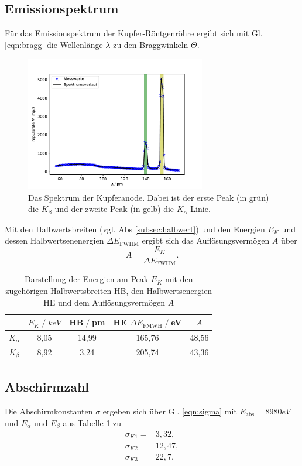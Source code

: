 \subsection{Emissionspektrum}
Für das Emissionspektrum der Kupfer-Röntgenröhre ergibt sich mit Gl. \ref{eqn:bragg} die 
Wellenlänge $\lambda$ zu den Braggwinkeln $\Theta$.
\begin{figure}[H]
    \centering
    \includegraphics[width=0.7\textwidth]{plots/spektrum.pdf}
    \caption{Das Spektrum der Kupferanode. Dabei ist der erste Peak (in grün)
    die $K_{\beta}$ und der zweite Peak (in gelb) die $K_{\alpha}$ 
    Linie.}
    \label{fig:peaks}
\end{figure}
Mit den Halbwertsbreiten (vgl. Abs \ref{subsec:halbwert}) und den Energien $E_K$ und dessen Halbwertsenenergien $\Delta E_{\text{FWHM}}$
ergibt sich das Auflösungsvermögen $A$ über
\begin{equation}
    A=\frac{E_K}{\Delta E_{\text{FWHM}}}.
\end{equation}
\begin{table}[H]
    \centering
    \begin{tabular}{c | c c c c}
        \toprule
        & $E_K\;/\;\si{keV}$ & HB$\;/\;$pm & HE $\Delta E_{\text{FMWH}}\;/\;$eV&$A$\\
        \midrule
        $K_{\alpha}$ & 8,05 & 14,99 & 165,76 &48,56\\
        $K_{\beta}$  & 8,92 & 3,24  & 205,74 &43,36\\
        \bottomrule
    \end{tabular}
    \caption{Darstellung der Energien am Peak $E_K$ mit den zugehörigen Halbwertsbreiten
    HB, den Halbwertsenergien HE und dem Auflösungsvermögen $A$}
    \label{tab:tabelle1}
\end{table}
\subsection{Abschirmzahl}
Die Abschirmkonstanten $\sigma$ ergeben sich über Gl. \ref{eqn:sigma} mit $E_{\text{abs}}=8980\si{eV}$\cite{anleitung}
und $E_{\alpha}$ und $E_{\beta}$ aus Tabelle \ref{tab:tabelle1} zu
\begin{align*}
    \sigma_{K1}=&3,32,\\
    \sigma_{K2}=&12,47,\\
    \sigma_{K3}=&22,7.\\
\end{align*}
